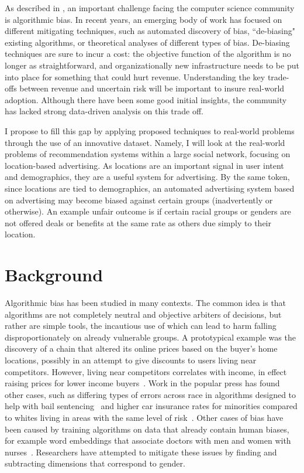 
As described in , an important challenge facing the computer science community is algorithmic bias.
In recent years, an emerging body of work has focused on different mitigating techniques, 
  such as automated discovery of bias, ``de-biasing" existing algorithms, or theoretical analyses of different types of bias.
De-biasing techniques are sure to incur a cost: the objective function of the algorithm is no longer as straightforward, and organizationally new infrastructure needs to be put into place for something that could hurt revenue.
Understanding the key trade-offs between revenue and uncertain risk will be important to insure real-world adoption.
Although there have been some good initial insights, the community has lacked strong data-driven analysis on this trade off.

I propose to fill this gap by applying proposed techniques to real-world problems through the use of an innovative dataset.
Namely, I will look at the real-world problems of recommendation systems within a large social network, focusing on location-based advertising.
As locations are an important signal in user intent and demographics, they are a useful system for advertising.
By the same token, since locations are tied to demographics, an automated advertising system based on advertising may become biased against certain groups (inadvertently or otherwise). 
An example unfair outcome is if certain racial groups or genders are not offered deals or benefits at the same rate as others due simply to their location.


\section{Background}
Algorithmic bias has been studied in many contexts.
The common idea is that algorithms are not completely neutral and objective arbiters of decisions, but rather are simple tools, the incautious use of which can lead to harm falling disproportionately on already vulnerable groups.
A prototypical example was the discovery of a chain that altered its online prices based on the buyer's home locations, possibly in an attempt to give discounts to users living near competitors.
However, living near competitors correlates with income, in effect raising prices for lower income buyers~\cite{ValentinoDevries:2012vv, Anonymous:2012wi}.
Work in the popular press has found other cases, such as differing types of errors across race in algorithms designed to help with bail sentencing~\cite{propublica:bias} and higher car insurance rates for minorities compared to whites living in areas with the same level of risk~\cite{propublica:cars}.
Other cases of bias have been caused by training algorithms on data that already contain human biases, for example word embeddings that associate doctors with men and women with nurses~\cite{bolukbasi2016man, caliskan2016semantics}.
Researchers have attempted to mitigate these issues by finding and subtracting dimensions that correspond to gender.


